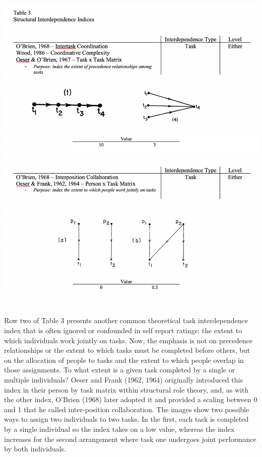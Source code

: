 \documentclass[english,,man]{apa6}
\theoremstyle{definition}
\theoremstyle{definition}
\theoremstyle{definition}
\theoremstyle{remark}
\begin{document}
\includegraphics{images/table3a.png}

Row two of Table 3 presents another common theoretical task
interdependence index that is often ignored or confounded in self report
ratings: the extent to which individuals work jointly on tasks. Now, the
emphasis is not on precedence relationships or the extent to which tasks
must be completed before others, but on the allocation of people to
tasks and the extent to which people overlap in those assignments. To
what extent is a given task completed by a single or multiple
individuals? Oeser and Frank (1962, 1964) originally introduced this
index in their person by task matrix within structural role theory, and,
as with the other index, O'Brien (1968) later adopted it and provided a
scaling between 0 and 1 that he called inter-position collaboration. The
images show two possible ways to assign two individuals to two tasks. In
the first, each task is completed by a single individual so the index
takes on a low value, whereas the index increases for the second
arrangement where task one undergoes joint performance by both
individuals.
\end{document}
